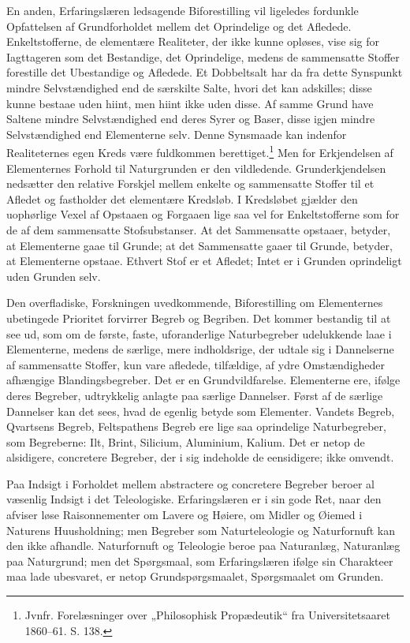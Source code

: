 \documentclass[12pt,a4paper]{book}
\begin{document}
En anden, Erfaringslæren ledsagende Biforestilling vil ligeledes fordunkle
Opfattelsen af Grundforholdet mellem det Oprindelige og det Afledede.
Enkeltstofferne, de elementære Realiteter, der ikke kunne opløses, vise
sig for Iagttageren
som det Bestandige, det Oprindelige, medens de sammensatte Stoffer
forestille det Ubestandige og Afledede. Et Dobbeltsalt har da fra dette
Synspunkt mindre Selvstændighed end de særskilte Salte, hvori det kan
adskilles; disse kunne bestaae uden hiint, men hiint ikke uden disse. Af
samme Grund have Saltene mindre Selvstændighed end deres Syrer og Baser,
disse igjen mindre Selvstændighed end Elementerne selv. Denne Synsmaade
kan indenfor Realiteternes egen Kreds være fuldkommen berettiget.\footnote{%
Jvnfr. Forelæsninger over „Philosophisk Propædeutik“ fra
Universitetsaaret 1860--61. S. 138.} Men for Erkjendelsen af Elementernes
Forhold til Naturgrunden er den vildledende. Grunderkjendelsen nedsætter
den relative Forskjel mellem enkelte og sammensatte Stoffer til et Afledet
og fastholder det elementære Kredsløb. I Kredsløbet gjælder den uophørlige
Vexel af Opstaaen og Forgaaen lige saa vel for Enkeltstofferne som for de
af dem sammensatte Stofsubstanser. At det Sammensatte opstaaer, betyder,
at Elementerne gaae til Grunde; at det Sammensatte gaaer til Grunde,
betyder, at Elementerne opstaae. Ethvert Stof er et Afledet; Intet er i
Grunden oprindeligt uden Grunden selv.

Den overfladiske, Forskningen uvedkommende, Biforestilling om Elementernes
ubetingede Prioritet forvirrer Begreb og Begriben. Det kommer bestandig
til at see ud, som om de første, faste, uforanderlige Naturbegreber
udelukkende laae i Elementerne, medens de særlige, mere indholdsrige, der
udtale sig i Dannelserne af sammensatte Stoffer, kun vare afledede,
tilfældige, af ydre Omstændigheder afhængige Blandingsbegreber. Det er en
Grundvildfarelse. Elementerne ere, ifølge deres Begreber, udtrykkelig
anlagte paa særlige Dannelser. Først af de særlige Dannelser kan det sees,
hvad de egenlig betyde som Elementer. Vandets Begreb,
Qvartsens Begreb, Feltspathens Begreb ere lige saa oprindelige
Naturbegreber, som Begreberne: Ilt, Brint, Silicium, Aluminium, Kalium.
Det er netop de alsidigere, concretere Begreber, der i sig indeholde de
eensidigere; ikke omvendt.

Paa Indsigt i Forholdet mellem abstractere og concretere Begreber beroer
al væsenlig Indsigt i det Teleologiske. Erfaringslæren er i sin gode Ret,
naar den afviser løse Raisonnementer om Lavere og Høiere, om Midler og
Øiemed i Naturens Huusholdning; men Begreber som Naturteleologie og
Naturfornuft kan den ikke afhandle. Naturfornuft og Teleologie beroe paa
Naturanlæg, Naturanlæg paa Naturgrund; men det Spørgsmaal, som
Erfaringslæren ifølge sin Charakteer maa lade ubesvaret, er netop
Grundspørgsmaalet, Spørgsmaalet om Grunden.
\end{document}

